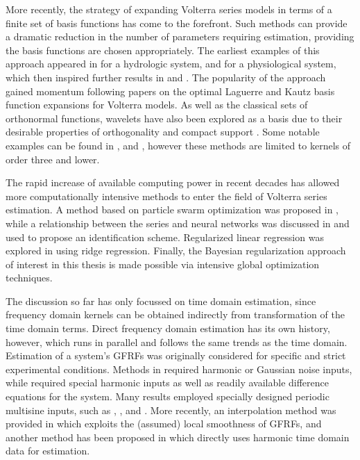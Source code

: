 More recently, the strategy of expanding Volterra series models in terms of a finite set of basis functions has come to the forefront. Such methods can provide a dramatic reduction in the number of parameters requiring estimation, providing the basis functions are chosen appropriately. The earliest examples of this approach appeared in \cite{Amorocho1971} for a hydrologic system, and \cite{Watanabe1975} for a physiological system, which then inspired further results in \cite{Ogura1985} and \cite{Marmarelis1993}. The popularity of the approach gained momentum following papers on the optimal Laguerre \cite{Campello2004} and Kautz \cite{Rosa2007} basis function expansions for Volterra models. As well as the classical sets of orthonormal functions, wavelets have also been explored as a basis due to their desirable properties of orthogonality and compact support \cite{Cheng2017}. Some notable examples can be found in \cite{Nikolaou2000}, \cite{Prazenica2004} and \cite{Prazenica2006}, however these methods are limited to kernels of order three and lower. 

The rapid increase of available computing power in recent decades has allowed more computationally intensive methods to enter the field of Volterra series estimation. A method based on particle swarm optimization was proposed in \cite{Chang2012}, while a relationship between the series and neural networks was discussed in \cite{Wray1994} and used to propose an identification scheme. Regularized linear regression was explored in \cite{Franz2006} using ridge regression. Finally, the Bayesian regularization approach \cite{Birpoutsoukis2017} of interest in this thesis is made possible via intensive global optimization techniques.

The discussion so far has only focussed on time domain estimation, since frequency domain kernels can be obtained indirectly from transformation of the time domain terms. Direct frequency domain estimation has its own history, however, which runs in parallel and follows the same trends as the time domain. Estimation of a system's GFRFs was originally considered for specific and strict experimental conditions. Methods in \cite{Bedrosian1971} required harmonic or Gaussian noise inputs, while \cite{Jones1989} required special harmonic inputs as well as readily available difference equations for the system. Many results employed specially designed periodic multisine inputs, such as \cite{Victor1980}, \cite{Boyd1983}, \cite{Chua1989} and \cite{Evans1996}. More recently, an interpolation method was provided in \cite{Nemeth2002} which exploits the (assumed) local smoothness of GFRFs, and another method has been proposed in \cite{Li2011} which directly uses harmonic time domain data for estimation.       

